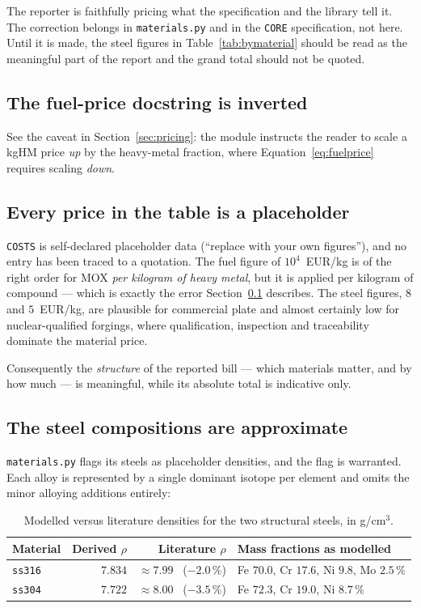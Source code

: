 \documentclass[9pt,a4paper]{extarticle}
\newcommand{\code}[1]{\texttt{\small #1}}
\newcommand{\file}[1]{\texttt{\small #1}}
\begin{document}
The reporter is faithfully pricing what the specification and the library tell
it. The correction belongs in \file{materials.py} and in the \code{CORE}
specification, not here. Until it is made, the steel figures in
Table~\ref{tab:bymaterial} should be read as the meaningful part of the report
and the grand total should not be quoted.

\subsection{The fuel-price docstring is inverted}
\label{sec:aud:kghm}

See the caveat in Section~\ref{sec:pricing}: the module instructs the reader to
scale a kgHM price \emph{up} by the heavy-metal fraction, where
Equation~\eqref{eq:fuelprice} requires scaling \emph{down}.

\subsection{Every price in the table is a placeholder}
\label{sec:aud:prices}

\code{COSTS} is self-declared placeholder data (``replace with your own
figures''), and no entry has been traced to a quotation. The fuel figure of
$10^4$~EUR/kg is of the right order for MOX \emph{per kilogram of heavy metal},
but it is applied per kilogram of compound --- which is exactly the error
Section~\ref{sec:aud:kghm} describes. The steel figures, $8$ and
$5$~EUR/kg, are plausible for commercial plate and almost certainly low for
nuclear-qualified forgings, where qualification, inspection and traceability
dominate the material price.

Consequently the \emph{structure} of the reported bill --- which materials
matter, and by how much --- is meaningful, while its absolute total is
indicative only.

\subsection{The steel compositions are approximate}
\label{sec:aud:steel}

\file{materials.py} flags its steels as placeholder densities, and the flag is
warranted. Each alloy is represented by a single dominant isotope per element
and omits the minor alloying additions entirely:

\begin{table}[h]
\centering
\footnotesize
\begin{tabular}{@{}lrrl@{}}
\toprule
\textbf{Material} & \textbf{Derived $\rho$} & \textbf{Literature $\rho$} & \textbf{Mass fractions as modelled} \\
\midrule
\code{ss316} & $7.834$ & $\approx 7.99$ \ ($-2.0\,\%$) & Fe $70.0$, Cr $17.6$, Ni $9.8$, Mo $2.5\,\%$ \\
\code{ss304} & $7.722$ & $\approx 8.00$ \ ($-3.5\,\%$) & Fe $72.3$, Cr $19.0$, Ni $8.7\,\%$ \\
\bottomrule
\end{tabular}
\caption{Modelled versus literature densities for the two structural steels,
in g/cm$^3$.}
\end{table}
\end{document}
